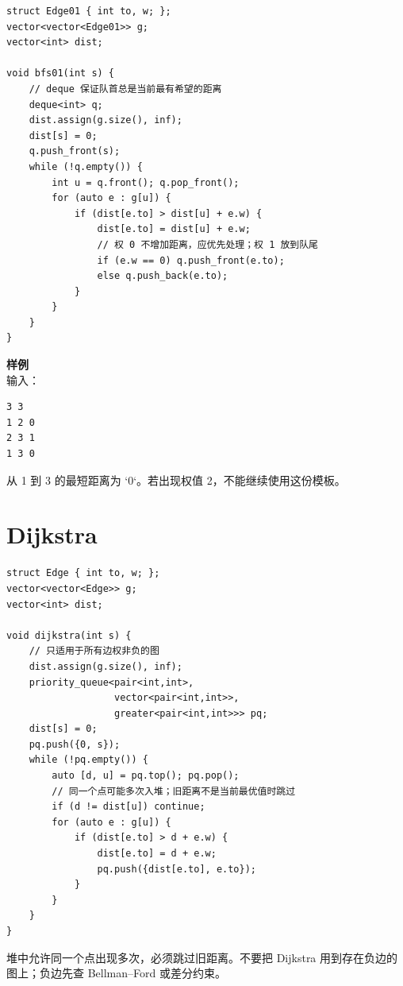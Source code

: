 
\begin{lstlisting}[style=cpp]
struct Edge01 { int to, w; };
vector<vector<Edge01>> g;
vector<int> dist;

void bfs01(int s) {
    // deque 保证队首总是当前最有希望的距离
    deque<int> q;
    dist.assign(g.size(), inf);
    dist[s] = 0;
    q.push_front(s);
    while (!q.empty()) {
        int u = q.front(); q.pop_front();
        for (auto e : g[u]) {
            if (dist[e.to] > dist[u] + e.w) {
                dist[e.to] = dist[u] + e.w;
                // 权 0 不增加距离，应优先处理；权 1 放到队尾
                if (e.w == 0) q.push_front(e.to);
                else q.push_back(e.to);
            }
        }
    }
}
\end{lstlisting}

\begin{card}
\textbf{样例}\\
输入：
\begin{lstlisting}
3 3
1 2 0
2 3 1
1 3 0
\end{lstlisting}
从 1 到 3 的最短距离为 `0`。若出现权值 2，不能继续使用这份模板。
\end{card}

\section{Dijkstra}


\begin{lstlisting}[style=cpp]
struct Edge { int to, w; };
vector<vector<Edge>> g;
vector<int> dist;

void dijkstra(int s) {
    // 只适用于所有边权非负的图
    dist.assign(g.size(), inf);
    priority_queue<pair<int,int>,
                   vector<pair<int,int>>,
                   greater<pair<int,int>>> pq;
    dist[s] = 0;
    pq.push({0, s});
    while (!pq.empty()) {
        auto [d, u] = pq.top(); pq.pop();
        // 同一个点可能多次入堆；旧距离不是当前最优值时跳过
        if (d != dist[u]) continue;
        for (auto e : g[u]) {
            if (dist[e.to] > d + e.w) {
                dist[e.to] = d + e.w;
                pq.push({dist[e.to], e.to});
            }
        }
    }
}
\end{lstlisting}

\begin{warnbox}
堆中允许同一个点出现多次，必须跳过旧距离。不要把 Dijkstra 用到存在负边的图上；负边先查 Bellman--Ford 或差分约束。
\end{warnbox}

